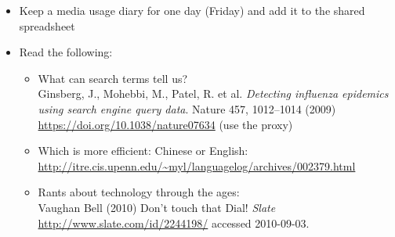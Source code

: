\documentclass[a4paper,landscape,headrule,footrule,xetex]{foils}
\begin{document}
\begin{itemize}
\item Keep a media usage diary for one day (Friday) and add it to the shared spreadsheet

\item Read the following:
  \begin{itemize}
  \item What can search terms tell us?  \\ Ginsberg, J., Mohebbi, M.,
    Patel, R. et al. \textit{Detecting influenza epidemics using search
    engine query data}. Nature 457, 1012–1014 (2009)
    \url{https://doi.org/10.1038/nature07634} (use the proxy)
  \item Which is more efficient: Chinese or English:
    \\ \url{http://itre.cis.upenn.edu/~myl/languagelog/archives/002379.html}
  \item Rants about technology through the ages: 
    \\ Vaughan Bell (2010) Don't touch that Dial! \textit{Slate}
    \\ \url{http://www.slate.com/id/2244198/} accessed 2010-09-03. 
  \end{itemize}
  
\end{itemize}


\end{document}
